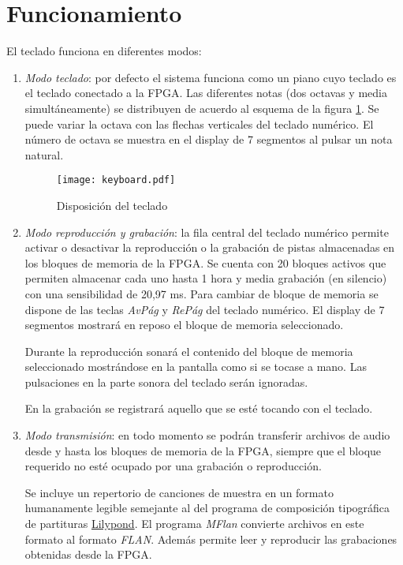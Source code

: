 \documentclass{article}
\begin{document}
\section{Funcionamiento}

	El teclado funciona en diferentes modos:

	\begin{enumerate}
		\item {\itshape Modo teclado}: por defecto el sistema funciona como un piano cuyo teclado es el teclado conectado a la FPGA. Las diferentes notas (dos octavas y media simultáneamente) se distribuyen de acuerdo al esquema de la figura \ref{fig:teclado}. Se puede variar la octava con las flechas verticales del teclado numérico. El número de octava se muestra en el display de 7 segmentos al pulsar un nota natural.

\begin{figure}[ht] \centering
	\texttt{[image: keyboard.pdf]}

	\caption{Disposición del teclado}
	\label{fig:teclado}
\end{figure}

	\item {\itshape Modo reproducción y grabación}: la fila central del teclado numérico permite activar o desactivar la reproducción o la grabación de pistas almacenadas en los bloques de memoria de la FPGA. Se cuenta con 20 bloques activos que permiten almacenar cada uno hasta 1 hora y media grabación (en silencio) con una sensibilidad de 20,97 ms. Para cambiar de bloque de memoria se dispone de las teclas {\itshape AvPág} y {\itshape RePág} del teclado numérico. El display de 7 segmentos mostrará en reposo el bloque de memoria seleccionado.

		Durante la reproducción sonará el contenido del bloque de memoria seleccionado mostrándose en la pantalla como si se tocase a mano. Las pulsaciones en la parte sonora del teclado serán ignoradas.

		En la grabación se registrará aquello que se esté tocando con el teclado.

	\item {\itshape Modo transmisión}: en todo momento se podrán transferir archivos de audio desde y hasta los bloques de memoria de la FPGA, siempre que el bloque requerido no esté ocupado por una grabación o reproducción.

		Se incluye un repertorio de canciones de muestra en un formato humanamente legible semejante al del programa de composición tipográfica de partituras \href{http://lilypond.org/}{Lilypond}. El programa {\itshape MFlan} convierte archivos en este formato al formato {\itshape FLAN}. Además permite leer y reproducir las grabaciones obtenidas desde la FPGA.


\end{enumerate}
\end{document}
